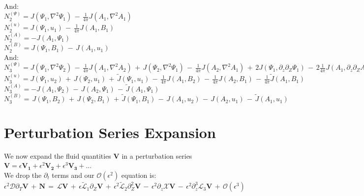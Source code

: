 \documentclass[letterpaper,12pt]{article}
\begin{document}
And: \\

$N_2^{(\Psi)} = J(\Psi_1, \nabla^2 \Psi_1) \,-\, \frac{1}{4\pi}J(A_1, \nabla^2 A_1) $ \\

$N_2^{(u)} = J(\Psi_1, u_1) \, - \, \frac{1}{4\pi} J(A_1, B_1) $ \\

$N_2^{(A)} = - J(A_1, \Psi_1)$ \\

$N_2^{(B)} =  J(\Psi_1, B_1) \, - \, J(A_1, u_1)$\\

And: \\

$N_3^{(\Psi)} = J(\Psi_1, \nabla^2\Psi_2) \, - \, \frac{1}{4\pi}J(A_1, \nabla^2 A_2) \,+\, J(\Psi_2, \nabla^2\Psi_1) \, - \, \frac{1}{4\pi}J(A_2, \nabla^2 A_1) \,+\, 2 J(\Psi_1, \partial_z\partial_Z \Psi_1) \, - \, 2 \frac{1}{4\pi}J(A_1, \partial_z\partial_Z A_1) \,+\, \widetilde{J}(\Psi_1, \nabla^2 \Psi_1) \, - \,  \frac{1}{4\pi}\widetilde{J}(A_1, \nabla^2 A_1) $ \\

$N_3^{(u)} = J(\Psi_1, u_2) \, + \, J(\Psi_2, u_1) \, + \, \widetilde{J}(\Psi_1, u_1) \, - \, \frac{1}{4\pi} J(A_1, B_2) \, - \, \frac{1}{4\pi} J(A_2, B_1) \, - \, \frac{1}{4\pi} \widetilde{J}(A_1, B_1)$ \\

$N_3^{(A)} = - J(A_1, \Psi_2) \, - \, J(A_2, \Psi_1) \, - \, \widetilde{J}(A_1, \Psi_1) \,$ \\

$N_3^{(B)} = \, J(\Psi_1, B_2) \, + \, J(\Psi_2, B_1) \, + \, \widetilde{J}(\Psi_1, B_1) \, - \, J(A_1, u_2) \, - \,  J(A_2, u_1) \, - \, \widetilde{J}(A_1, u_1) \, $\\

\section*{Perturbation Series Expansion}

We now expand the fluid quantities $\mathbf{V}$ in a perturbation series $\mathbf{V} = \epsilon\mathbf{V_1} + \epsilon^2\mathbf{V_2} + \epsilon^3\mathbf{V_3} + ...$ \\

We drop the $\partial_t$ terms and our $\mathcal{O}(\epsilon^2)$ equation is: \\

$\epsilon^2 \mathcal{D}\partial_T\mathbf{V} \, + \, \mathbf{N} \, = \, \mathcal{L}\mathbf{V} \, + \, \epsilon\widetilde{\mathcal{L}}_1\partial_Z\mathbf{V} \, + \, \epsilon^2\widetilde{\mathcal{L}}_2\partial_Z^2\mathbf{V} \, - \, \epsilon^2\partial_z\mathcal{X}\mathbf{V} \, - \, \epsilon^2\partial_z^3\mathcal{L}_3\mathbf{V} \, + \, \mathcal{O}(\epsilon^3)$ \\
\end{document}

